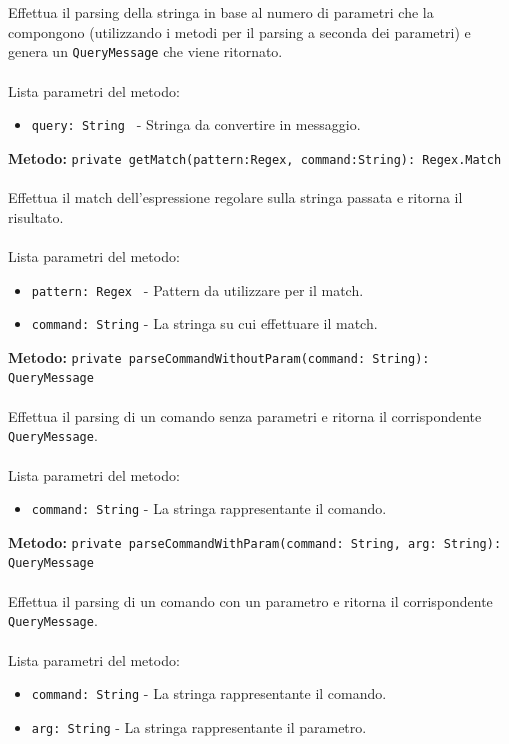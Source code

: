 \documentclass[a4paper]{article}
\begin{document}
			\\ \\
			Effettua il parsing della stringa in base al numero di parametri che la compongono (utilizzando i metodi per il parsing a seconda dei parametri) e genera un \texttt{QueryMessage} che viene ritornato.
			\\ \\
			Lista parametri del metodo:
			\begin{itemize}
				\item \texttt{query: String } - Stringa da convertire in messaggio.
			\end{itemize}
			\textbf{Metodo: }\texttt{private getMatch(pattern:Regex, command:String): Regex.Match}
			\\ \\
			Effettua il match dell'espressione regolare sulla stringa passata e ritorna il risultato.
			\\ \\
			Lista parametri del metodo:
			\begin{itemize}
				\item \texttt{pattern: Regex } - Pattern da utilizzare per il match.
				\item \texttt{command: String} - La stringa su cui effettuare il match.
			\end{itemize}
			\textbf{Metodo: }\texttt{private parseCommandWithoutParam(command: String): QueryMessage}
			\\ \\
			Effettua il parsing di un comando senza parametri e ritorna il corrispondente \texttt{QueryMessage}.
			\\ \\
			Lista parametri del metodo:
			\begin{itemize}
				\item \texttt{command: String} - La stringa rappresentante il comando.
			\end{itemize}
			\textbf{Metodo: }\texttt{private parseCommandWithParam(command: String, arg: String): QueryMessage}
			\\ \\
			Effettua il parsing di un comando con un parametro e ritorna il corrispondente \texttt{QueryMessage}.
			\\ \\
			Lista parametri del metodo:
			\begin{itemize}
				\item \texttt{command: String} - La stringa rappresentante il comando.
				\item \texttt{arg: String} - La stringa rappresentante il parametro.
			\end{itemize}
\end{document}
